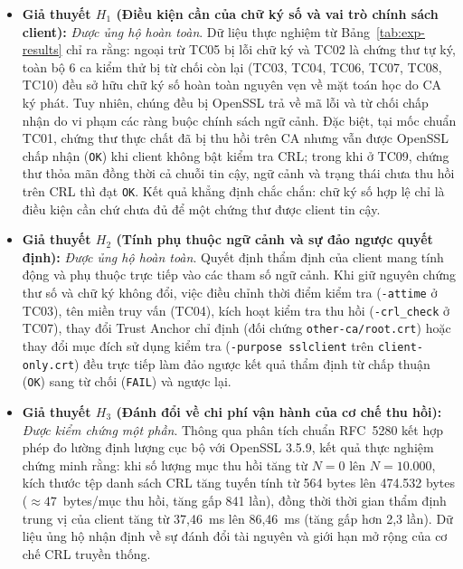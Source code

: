 \begin{itemize}
    \item \textbf{Giả thuyết $H_1$ (Điều kiện cần của chữ ký số và vai trò chính sách client):} \textit{Được ủng hộ hoàn toàn}. Dữ liệu thực nghiệm từ Bảng~\ref{tab:exp-results} chỉ ra rằng: ngoại trừ TC05 bị lỗi chữ ký và TC02 là chứng thư tự ký, toàn bộ 6 ca kiểm thử bị từ chối còn lại (TC03, TC04, TC06, TC07, TC08, TC10) đều sở hữu chữ ký số hoàn toàn nguyên vẹn về mặt toán học do CA ký phát. Tuy nhiên, chúng đều bị OpenSSL trả về mã lỗi và từ chối chấp nhận do vi phạm các ràng buộc chính sách ngữ cảnh. Đặc biệt, tại mốc chuẩn TC01, chứng thư thực chất đã bị thu hồi trên CA nhưng vẫn được OpenSSL chấp nhận (\texttt{OK}) khi client không bật kiểm tra CRL; trong khi ở TC09, chứng thư thỏa mãn đồng thời cả chuỗi tin cậy, ngữ cảnh và trạng thái chưa thu hồi trên CRL thì đạt \texttt{OK}. Kết quả khẳng định chắc chắn: chữ ký số hợp lệ chỉ là điều kiện cần chứ chưa đủ để một chứng thư được client tin cậy.

    \item \textbf{Giả thuyết $H_2$ (Tính phụ thuộc ngữ cảnh và sự đảo ngược quyết định):} \textit{Được ủng hộ hoàn toàn}. Quyết định thẩm định của client mang tính động và phụ thuộc trực tiếp vào các tham số ngữ cảnh. Khi giữ nguyên chứng thư số và chữ ký không đổi, việc điều chỉnh thời điểm kiểm tra (\texttt{-attime} ở TC03), tên miền truy vấn (TC04), kích hoạt kiểm tra thu hồi (\texttt{-crl\_check} ở TC07), thay đổi Trust Anchor chỉ định (đối chứng \texttt{other-ca/root.crt}) hoặc thay đổi mục đích sử dụng kiểm tra (\texttt{-purpose sslclient} trên \texttt{client-only.crt}) đều trực tiếp làm đảo ngược kết quả thẩm định từ chấp thuận (\texttt{OK}) sang từ chối (\texttt{FAIL}) và ngược lại.

    \item \textbf{Giả thuyết $H_3$ (Đánh đổi về chi phí vận hành của cơ chế thu hồi):} \textit{Được kiểm chứng một phần}. Thông qua phân tích chuẩn RFC~5280 kết hợp phép đo lường định lượng cục bộ với OpenSSL 3.5.9, kết quả thực nghiệm chứng minh rằng: khi số lượng mục thu hồi tăng từ $N=0$ lên $N=10.000$, kích thước tệp danh sách CRL tăng tuyến tính từ 564 bytes lên 474.532 bytes ($\approx 47$~bytes/mục thu hồi, tăng gấp 841 lần), đồng thời thời gian thẩm định trung vị của client tăng từ 37{,}46~ms lên 86{,}46~ms (tăng gấp hơn 2{,}3 lần). Dữ liệu ủng hộ nhận định về sự đánh đổi tài nguyên và giới hạn mở rộng của cơ chế CRL truyền thống.
\end{itemize}

